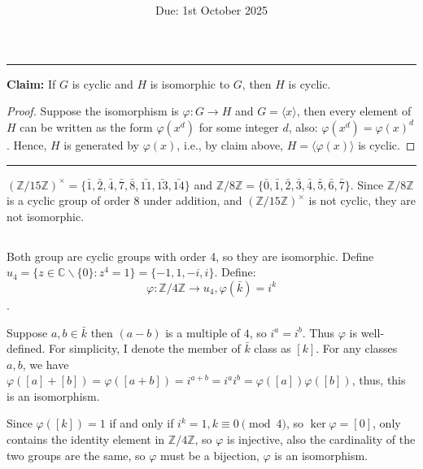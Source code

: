 \documentclass[12pt]{article}
\title{\textbf{\mytitle}}
\author{\textbf{\myauthor}}
\date{Due: 1st October 2025}
\begin{document}
\onehalfspacing
\maketitle

\section{} %
\subsection{} %
\noindent\rule{\textwidth}{1pt}

\textbf{Claim: }If $G$ is cyclic and $H$ is isomorphic to $G$, then $H$ is cyclic.
\begin{proof}
Suppose the isomorphism is $\varphi: G\rightarrow H$ and $G=\langle x\rangle$, then every element of $H$ can be written as the form $\varphi(x^d)$ for some integer $d$, also: $\varphi(x^d)=\varphi(x)^d$. Hence, $H$ is generated by $\varphi(x)$, i.e., by claim above, $H=\langle \varphi(x)\rangle$ is cyclic.
\end{proof}

\noindent\rule{\textwidth}{1pt}


$(\mathbb{Z}/15\mathbb{Z})^{\times}=\{\bar{1},\bar{2},\bar{4},\bar{7},\bar{8},\bar{11},\bar{13},\bar{14}\}$ and $\mathbb{Z}/8\mathbb{Z}=\{\bar{0},\bar{1},\bar{2},\bar{3},\bar{4},\bar{5},\bar{6},\bar{7}\}$. Since $\mathbb{Z}/8\mathbb{Z}$ is a cyclic group of order $8$ under addition, and $(\mathbb{Z}/15\mathbb{Z})^{\times}$ is not cyclic, they are not isomorphic.
\subsection{} %
Both group are cyclic groups with order 4, so they are isomorphic. Define $u_4=\{z\in \mathbb{C}\backslash\{0\}:z^4=1\}=\{-1, 1, -i, i\}$. Define:
$$\varphi:\mathbb{Z}/4\mathbb{Z}\rightarrow u_4,\varphi{(\bar{k})}=i^{k}$$.

Suppose $a,b\in\bar{k}$ then $(a-b)$ is a multiple of $4$, so $i^{a}=i^b$. Thus $\varphi$ is well-defined. For simplicity, I denote the member of $\bar{k}$ class as $[k]$. For any classes $a,b$, we have $\varphi([a]+[b])=\varphi([a+b])=i^{a+b}=i^a i^b=\varphi([a])\varphi([b])$, thus, this is an isomorphism.

Since $\varphi([k])=1$ if and only if $i^k=1, k\equiv0\pmod{4}$, so $\ker\varphi={[0]}$, only contains the identity element in $\mathbb Z/4\mathbb Z$, so $\varphi$ is injective, also the cardinality of the two groups are the same, so $\varphi$ must be a bijection, $\varphi$ is an isomorphism.
\end{document}
